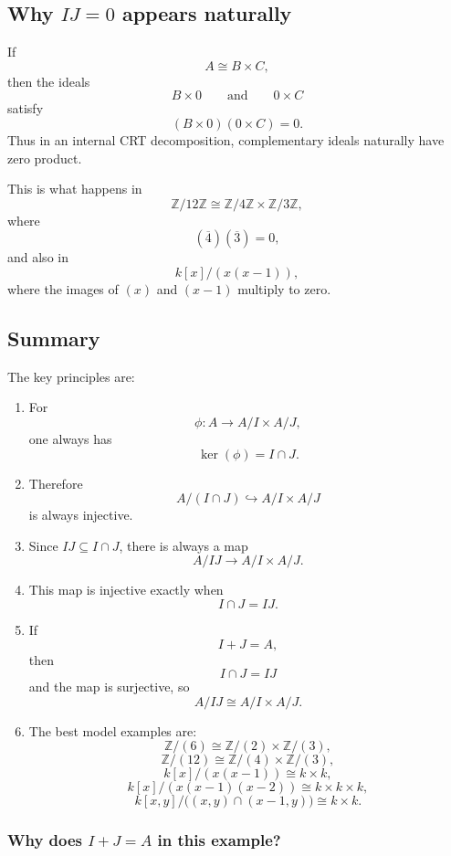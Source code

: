 \documentclass[12pt,a4paper]{article}
\theoremstyle{notespace}
\begin{document}
\subsection{Why \(IJ=0\) appears naturally}

If
\[
A\cong B\times C,
\]
then the ideals
\[
B\times 0
\qquad\text{and}\qquad
0\times C
\]
satisfy
\[
(B\times 0)(0\times C)=0.
\]
Thus in an internal CRT decomposition, complementary ideals naturally have zero product.

This is what happens in
\[
\mathbb Z/12\mathbb Z\cong \mathbb Z/4\mathbb Z\times \mathbb Z/3\mathbb Z,
\]
where
\[
(\overline 4)(\overline 3)=0,
\]
and also in
\[
k[x]/(x(x-1)),
\]
where the images of \((x)\) and \((x-1)\) multiply to zero.

\subsection{Summary}

The key principles are:

\begin{enumerate}
	\item For
	\[
	\phi:A\to A/I\times A/J,
	\]
	one always has
	\[
	\ker(\phi)=I\cap J.
	\]
	
	\item Therefore
	\[
	A/(I\cap J)\hookrightarrow A/I\times A/J
	\]
	is always injective.
	
	\item Since \(IJ\subseteq I\cap J\), there is always a map
	\[
	A/IJ\to A/I\times A/J.
	\]
	
	\item This map is injective exactly when
	\[
	I\cap J=IJ.
	\]
	
	\item If
	\[
	I+J=A,
	\]
	then
	\[
	I\cap J=IJ
	\]
	and the map is surjective, so
	\[
	A/IJ\cong A/I\times A/J.
	\]
	
	\item The best model examples are:
	\[
	\mathbb Z/(6)\cong \mathbb Z/(2)\times \mathbb Z/(3),
	\]
	\[
	\mathbb Z/(12)\cong \mathbb Z/(4)\times \mathbb Z/(3),
	\]
	\[
	k[x]/(x(x-1))\cong k\times k,
	\]
	\[
	k[x]/(x(x-1)(x-2))\cong k\times k\times k,
	\]
	\[
	k[x,y]/\big((x,y)\cap(x-1,y)\big)\cong k\times k.
	\]
\end{enumerate}

\subsubsection*{Why does \(I+J=A\) in this example?}
\end{document}
